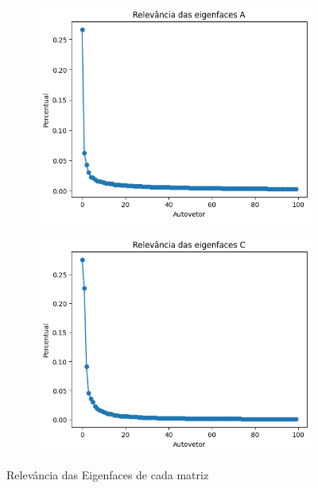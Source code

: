 \documentclass[12pt]{article}
\begin{document}
        \begin{figure}[H]
              \begin{subfigure}{0.5\textwidth}
                \centering
                \includegraphics[width=\textwidth]{img/MAIN_10.png}
                \label{fig:imagem1}
              \end{subfigure}
              \hfill
              \begin{subfigure}{0.5\textwidth}
                \centering
                \includegraphics[width=\textwidth]{img/MAIN_11.png}
                \label{fig:imagem2}
              \end{subfigure}
              \caption{Relevância das Eigenfaces de cada matriz}
        \end{figure}
\end{document}

